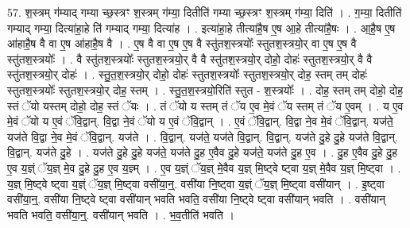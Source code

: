 \documentclass[17pt]{extarticle}
\begin{document}
57. श॒स्त्रम् ग॑म्याद् गम्या च्छ॒स्त्रꣳ श॒स्त्रम् ग॑म्या॒ दितीति॑ गम्या च्छ॒स्त्रꣳ श॒स्त्रम् ग॑म्या॒ दिति॑ । . ग॒म्या॒ दितीति॑ गम्याद् गम्या॒ दित्या॑हा॒हे ति॑ गम्याद् गम्या॒ दित्या॑ह । . इत्या॑हा॒हे तीत्या॑है॒ष ए॒ष आ॒हे तीत्या॑है॒षः । . आ॒है॒ष ए॒ष आ॑हाहै॒ष वै वा ए॒ष आ॑हाहै॒ष वै । . ए॒ष वै वा ए॒ष ए॒ष वै स्तु॑तश॒स्त्रयोः᳚ स्तुतश॒स्त्रयो॒र् वा ए॒ष ए॒ष वै स्तु॑तश॒स्त्रयोः᳚ । . वै स्तु॑तश॒स्त्रयोः᳚ स्तुतश॒स्त्रयो॒र् वै वै स्तु॑तश॒स्त्रयो॒र् दोहो॒ दोहः॑ स्तुतश॒स्त्रयो॒र् वै वै स्तु॑तश॒स्त्रयो॒र् दोहः॑ । . स्तु॒त॒श॒स्त्रयो॒र् दोहो॒ दोहः॑ स्तुतश॒स्त्रयोः᳚ स्तुतश॒स्त्रयो॒र् दोह॒ स्तम् तम् दोहः॑ स्तुतश॒स्त्रयोः᳚ स्तुतश॒स्त्रयो॒र् दोह॒ स्तम् । . स्तु॒त॒श॒स्त्रयो॒रिति॑ स्तुत - श॒स्त्रयोः᳚ । . दोह॒ स्तम् तम् दोहो॒ दोह॒ स्तं ॅयो यस्तम् दोहो॒ दोह॒ स्तं ॅयः । . तं ॅयो य स्तम् तं ॅय ए॒व मे॒वं ॅय स्तम् तं ॅय ए॒वम् । . य ए॒व मे॒वं ॅयो य ए॒वं ॅवि॒द्वान्. वि॒द्वा ने॒वं ॅयो य ए॒वं ॅवि॒द्वान् । . ए॒वं ॅवि॒द्वान्. वि॒द्वा ने॒व मे॒वं ॅवि॒द्वान्. यज॑ते॒ यज॑ते वि॒द्वा ने॒व मे॒वं ॅवि॒द्वान्. यज॑ते । . वि॒द्वान्. यज॑ते॒ यज॑ते वि॒द्वान्. वि॒द्वान्. यज॑ते दु॒हे दु॒हे यज॑ते वि॒द्वान्. वि॒द्वान्. यज॑ते दु॒हे । . यज॑ते दु॒हे दु॒हे यज॑ते॒ यज॑ते दु॒ह ए॒वैव दु॒हे यज॑ते॒ यज॑ते दु॒ह ए॒व । . दु॒ह ए॒वैव दु॒हे दु॒ह ए॒व य॒ज्ञ्ं ॅय॒ज्ञ् मे॒व दु॒हे दु॒ह ए॒व य॒ज्ञ्म् । . ए॒व य॒ज्ञ्ं ॅय॒ज्ञ् मे॒वैव य॒ज्ञ् मि॒ष्ट्वे ष्ट्वा य॒ज्ञ् मे॒वैव य॒ज्ञ् मि॒ष्ट्वा । . य॒ज्ञ् मि॒ष्ट्वे ष्ट्वा य॒ज्ञ्ं ॅय॒ज्ञ् मि॒ष्ट्वा वसी॑या॒न्॒. वसी॑या नि॒ष्ट्वा य॒ज्ञ्ं ॅय॒ज्ञ् मि॒ष्ट्वा वसी॑यान् । . इ॒ष्ट्वा वसी॑या॒न्॒. वसी॑या नि॒ष्ट्वे ष्ट्वा वसी॑यान् भवति भवति॒ वसी॑या नि॒ष्ट्वे ष्ट्वा वसी॑यान् भवति । . वसी॑यान् भवति भवति॒ वसी॑या॒न्॒. वसी॑यान् भवति । . भ॒व॒तीति॑ भवति । \newline
\pagebreak
{}
\end{document}
